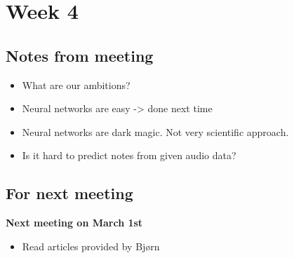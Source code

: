 
\section{Week 4}

\subsection{Notes from meeting}

\begin{itemize}
\item What are our ambitions?
\item Neural networks are easy -> done next time
\item Neural networks are dark magic. Not very scientific approach.
\item Is it hard to predict notes from given audio data?
\end{itemize}

\subsection{For next meeting}

\textbf{Next meeting on March 1st}

\begin{itemize}
\item Read articles provided by Bjørn
\end{itemize}
